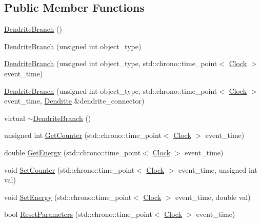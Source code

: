 \subsection*{Public Member Functions}
\begin{DoxyCompactItemize}
\item 
\hyperlink{class_dendrite_branch_af391f5fd2379539523b3d2523c59ea8b}{Dendrite\+Branch} ()
\item 
\hyperlink{class_dendrite_branch_a391ba1440a6c29a0752b03eb60357370}{Dendrite\+Branch} (unsigned int object\+\_\+type)
\item 
\hyperlink{class_dendrite_branch_a390bfee680074f5f3ddcd9aee54db679}{Dendrite\+Branch} (unsigned int object\+\_\+type, std\+::chrono\+::time\+\_\+point$<$ \hyperlink{universe_8h_a0ef8d951d1ca5ab3cfaf7ab4c7a6fd80}{Clock} $>$ event\+\_\+time)
\item 
\hyperlink{class_dendrite_branch_a9b7e932b0614dad370edd76f31900c40}{Dendrite\+Branch} (unsigned int object\+\_\+type, std\+::chrono\+::time\+\_\+point$<$ \hyperlink{universe_8h_a0ef8d951d1ca5ab3cfaf7ab4c7a6fd80}{Clock} $>$ event\+\_\+time, \hyperlink{class_dendrite}{Dendrite} \&dendrite\+\_\+connector)
\item 
virtual \hyperlink{class_dendrite_branch_a38707cb6d1f9f07c6e8aa34a8a415051}{$\sim$\+Dendrite\+Branch} ()
\item 
unsigned int \hyperlink{class_dendrite_branch_a4d4a4b1591dd612eef903d95605d50fd}{Get\+Counter} (std\+::chrono\+::time\+\_\+point$<$ \hyperlink{universe_8h_a0ef8d951d1ca5ab3cfaf7ab4c7a6fd80}{Clock} $>$ event\+\_\+time)
\item 
double \hyperlink{class_dendrite_branch_afab2dd907fba115c3483cd9a217ccec0}{Get\+Energy} (std\+::chrono\+::time\+\_\+point$<$ \hyperlink{universe_8h_a0ef8d951d1ca5ab3cfaf7ab4c7a6fd80}{Clock} $>$ event\+\_\+time)
\item 
void \hyperlink{class_dendrite_branch_a2ce03fbad4a70564eeaafb62debd4d74}{Set\+Counter} (std\+::chrono\+::time\+\_\+point$<$ \hyperlink{universe_8h_a0ef8d951d1ca5ab3cfaf7ab4c7a6fd80}{Clock} $>$ event\+\_\+time, unsigned int val)
\item 
void \hyperlink{class_dendrite_branch_a13dd0373022d653448c9067d075586a8}{Set\+Energy} (std\+::chrono\+::time\+\_\+point$<$ \hyperlink{universe_8h_a0ef8d951d1ca5ab3cfaf7ab4c7a6fd80}{Clock} $>$ event\+\_\+time, double val)
\item 
bool \hyperlink{class_dendrite_branch_a70b5e63fc44166ccd7f0c7177660c250}{Reset\+Parameters} (std\+::chrono\+::time\+\_\+point$<$ \hyperlink{universe_8h_a0ef8d951d1ca5ab3cfaf7ab4c7a6fd80}{Clock} $>$ event\+\_\+time)

\end{DoxyCompactItemize}
